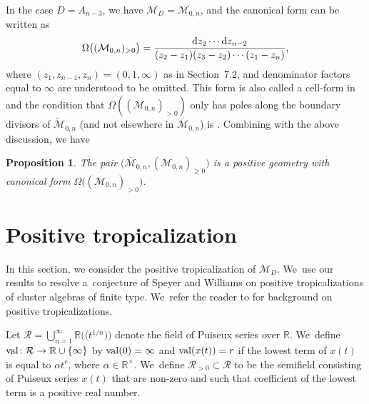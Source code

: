 \documentclass[pdftex]{sigma}%
\def\R{{\mathbb R}}
\def\M{{\mathcal{M}}}
\def\tM{{\widetilde {\mathcal{M}}}}
\def\bM{{\overline {\mathcal{M}}}}
\numberwithin{equation}{section}
\newtheorem{Proposition}[Theorem]{Proposition}
\begin{document}
In the case $D=A_{n-3}$, we have $\M_D = \M_{0,n}$, and the canonical form can be written as
\begin{gather*}
\Omega\big((\M_{0,n})_{>0}\big) = \frac{{\rm d}z_2 \cdots {\rm d}z_{n-2}}{(z_2-z_1)(z_3-z_2)\cdots(z_1-z_n)},
\end{gather*}
where $(z_1,z_{n-1},z_n) = (0,1,\infty)$ as in Section~7.2, and denominator factors equal to $\infty$ are understood to be omitted.
This form is also called a cell-form in~\cite{BCS} and the condition that $\Omega((\M_{0,n})_{>0})$ only has poles along the boundary divisors of $\tM_{0,n}$ \big(and not elsewhere in $\bM_{0,n}$\big) is \cite[Proposition~2.7]{BCS}. Combining with the above discussion, we have
{\sloppy\begin{Proposition}
The pair $\big(\bM_{0,n},( \M_{0,n})_{\geq 0}\big)$ is a positive geometry with canonical form $\Omega\big((\M_{0,n})_{>0}\big) $.
\end{Proposition}

}

\section{Positive tropicalization}
\def\RR{{\mathcal R}}
\def\val{{\rm val}}

In this section, we consider the positive tropicalization of $\M_D$. We~use our results to resolve a~conjecture of Speyer and Williams \cite{SW} on positive tropicalizations of cluster algebras of finite type. We~refer the reader to \cite{SW} for background on positive tropicalizations.

Let $\RR = \bigcup_{n=1}^\infty \R\big(\big(t^{1/n}\big)\big) $ denote the field of Puiseux series over $\R$. We~define $\val\colon \RR \to \R \cup \{\infty\}$ by $\val(0) = \infty$ and $\val(x(t)) = r$ if the lowest term of $x(t)$ is equal to $\alpha t^r$, where $\alpha \in \R^\times$. We~define $\RR_{>0} \subset \RR$ to be the semifield consisting of Puiseux series $x(t)$ that are non-zero and such that coefficient of the lowest term is a positive real number.
\end{document}
